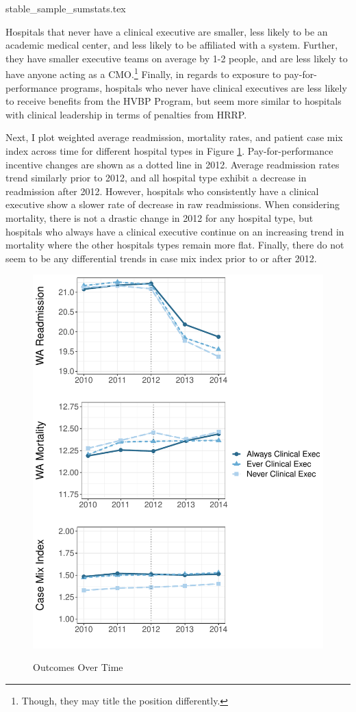\documentclass[12pt]{article}
\begin{document}
    {stable_sample_sumstats.tex}

    Hospitals that never have a clinical executive are smaller, less likely to be an academic medical center, and less likely to be affiliated with a system. Further, they have smaller executive teams on average by 1-2 people, and are less likely to have anyone acting as a CMO.\footnote{Though, they may title the position differently.} Finally, in regards to exposure to pay-for-performance programs, hospitals who never have clinical executives are less likely to receive benefits from the HVBP Program, but seem more similar to hospitals with clinical leadership in terms of penalties from HRRP. 

    Next, I plot weighted average readmission, mortality rates, and patient case mix index across time for different hospital types in Figure \ref{fig:outcomes_graph}. Pay-for-performance incentive changes are shown as a dotted line in 2012. Average readmission rates trend similarly prior to 2012, and all hospital type exhibit a decrease in readmission after 2012. However, hospitals who consistently have a clinical executive show a slower rate of decrease in raw readmissions. When considering mortality, there is not a drastic change in 2012 for any hospital type, but hospitals who always have a clinical executive continue on an increasing trend in mortality where the other hospitals types remain more flat. Finally, there do not seem to be any differential trends in case mix index prior to or after 2012. 

    \begin{figure}[ht!]
    \centering
        \caption{Outcomes Over Time}
        \includegraphics[width=.8\textwidth]{Objects/outcomes_graph.pdf}
        \label{fig:outcomes_graph}
    \end{figure}
\end{document}
